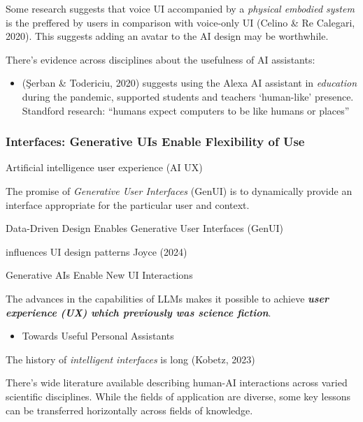 \documentclass[
  letterpaper,
  DIV=11,
  numbers=noendperiod]{scrartcl}
\providecommand{\tightlist}{%
  \setlength{\itemsep}{0pt}\setlength{\parskip}{0pt}}\usepackage{longtable,booktabs,array}
\begin{document}
Some research suggests that voice UI accompanied by a \emph{physical
embodied system} is the preffered by users in comparison with voice-only
UI (Celino \& Re Calegari, 2020). This suggests adding an avatar to the
AI design may be worthwhile.

There's evidence across disciplines about the usefulness of AI
assistants:

\begin{itemize}
\tightlist
\item
  (Şerban \& Todericiu, 2020) suggests using the Alexa AI assistant in
  \emph{education} during the pandemic, supported students and teachers
  `human-like' presence. Standford research: ``humans expect computers
  to be like humans or places''
\end{itemize}

\subsubsection{\texorpdfstring{Interfaces: \textbf{Generative UIs Enable
Flexibility of
Use}}{Interfaces: Generative UIs Enable Flexibility of Use}}\label{interfaces-generative-uis-enable-flexibility-of-use}

Artificial intelligence user experience (AI UX)

The promise of \emph{Generative User Interfaces} (GenUI) is to
dynamically provide an interface appropriate for the particular user and
context.

Data-Driven Design Enables Generative User Interfaces (GenUI)

influences UI design patterns Joyce (2024)

Generative AIs Enable New UI Interactions

The advances in the capabilities of LLMs makes it possible to achieve
\textbf{\emph{user experience (UX) which previously was science
fiction}}.

\begin{itemize}
\tightlist
\item
  Towards Useful Personal Assistants
\end{itemize}

The history of \emph{intelligent interfaces} is long (Kobetz, 2023)

There's wide literature available describing human-AI interactions
across varied scientific disciplines. While the fields of application
are diverse, some key lessons can be transferred horizontally across
fields of knowledge.
\end{document}
